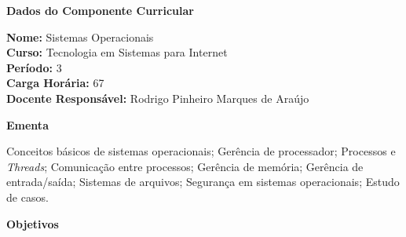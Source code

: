 

\begin{snugshade}\begin{center}\textbf{
    Dados do Componente Curricular
}\end{center}\end{snugshade}

\noindent \textbf{Nome:}                Sistemas Operacionais
\\        \textbf{Curso:}               Tecnologia em Sistemas para Internet
\\        \textbf{Período:}             \unit{3}{\degree}
\\        \textbf{Carga Horária:}       \unit{67}{\hour}
\\        \textbf{Docente Responsável:} Rodrigo Pinheiro Marques de Araújo


\begin{snugshade}\begin{center}\textbf{
    Ementa
\vphantom{q}}\end{center}\end{snugshade}

\noindent
Conceitos básicos de sistemas operacionais; Gerência de processador; Processos e \textit{Threads}; Comunicação entre processos; Gerência de memória; Gerência de entrada/saída; Sistemas de arquivos; Segurança em sistemas operacionais; Estudo de casos.


\begin{snugshade}\begin{center}\textbf{
    Objetivos
}\end{center}\end{snugshade}

